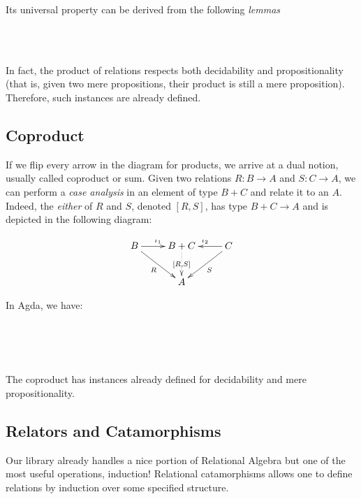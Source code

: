 
Its universal property can be derived from the following \emph{lemmas}

\\
\\

In fact, the product of relations respects both decidability and propositionality (that is,
given two mere propositions, their product is still a mere proposition). Therefore, such 
instances are already defined.

\subsection{Coproduct}

If we flip every arrow in the diagram for products, we arrive at a dual notion, usually
called coproduct or sum. Given two relations $R : B \rightarrow A$ and $S : C \rightarrow A$,
we can perform a \emph{case analysis} in an element of type $B + C$ and relate it to an $A$.
Indeed, the \emph{either} of $R$ and $S$, denoted $[R , S]$, has type $B + C \rightarrow A$
and is depicted in the following diagram:

\begin{displaymath}
\xymatrix{%
 B \ar[r]^{\iota_1} \ar[dr]_{R} & B + C \ar@{..>}[d]|{[R , S]} & C \ar[l]_{\iota_2} \ar[dl]^{S} \\
   &   A   &
}
\end{displaymath}

In Agda, we have:

\\
\\
\\

The coproduct has instances already defined for decidability and mere propositionality.

\subsection{Relators and Catamorphisms}

Our library already handles a nice portion of Relational Algebra but one of the most
useful operations, induction! Relational catamorphisms allows one to define relations
by induction over some specified structure. 

